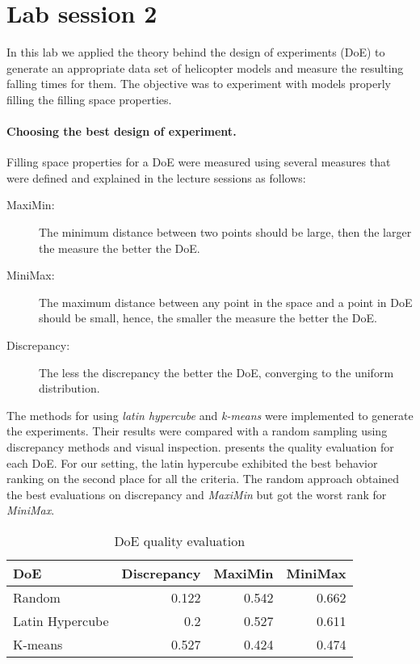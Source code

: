\section{Lab session 2}

In this lab we applied the theory behind the design of experiments (DoE) to
generate an appropriate data set of helicopter models and measure the resulting
falling times for them. The objective was to experiment with models properly
filling the filling space properties.

\paragraph{Choosing the best design of experiment.} Filling space properties for
a DoE were measured using several measures that were defined and explained in
the lecture sessions as follows:

\begin{description}
	\item[MaxiMin:] The minimum distance between two points should be large, then
	the larger the measure the better the DoE.

	\item[MiniMax:] The maximum distance between any point in the space and a point
	in DoE should be small, hence, the smaller the measure the better the DoE.

	\item[Discrepancy:] The less the discrepancy the better the DoE, converging to
	the uniform distribution.
\end{description}

The methods for using \emph{latin hypercube} and \emph{k-means} were implemented
to generate the experiments. Their results were compared with a random sampling
using discrepancy methods and visual inspection.  presents
the quality evaluation for each DoE. For our setting, the latin hypercube
exhibited the best behavior ranking on the second place for all the criteria.
The random approach obtained the best evaluations on discrepancy and
\emph{MaxiMin} but got the worst rank for \emph{MiniMax}.

\begin{table}[h]
	\centering
	\begin{tabular}{lrrr}
		\toprule
		DoE             & Discrepancy & MaxiMin & MiniMax \\
		\midrule
		Random          & 0.122       & 0.542   & 0.662 \\
		Latin Hypercube & 0.2         & 0.527   & 0.611 \\
		K-means          & 0.527       & 0.424   & 0.474 \\
		\bottomrule
	\end{tabular}
	\caption{DoE quality evaluation} 
	\label{tab:doe_eval} 
\end{table}


